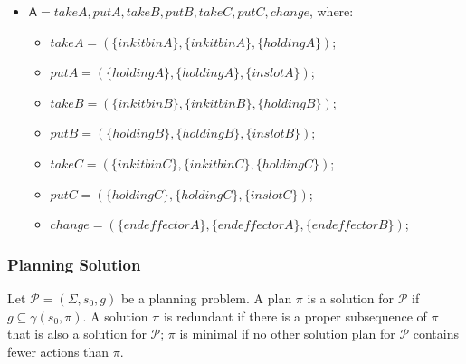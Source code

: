 \begin{itemize}
\item $\mathsf{A}={takeA,putA,takeB,putB,takeC,putC,change}$, where:
\begin{itemize}
\item $takeA=(\lbrace inkitbinA\rbrace,\lbrace inkitbinA\rbrace,\lbrace holdingA\rbrace)$;
\item $putA=(\lbrace holdingA\rbrace,\lbrace holdingA\rbrace,\lbrace inslotA\rbrace)$;
\item $takeB=(\lbrace inkitbinB\rbrace,\lbrace inkitbinB\rbrace,\lbrace holdingB\rbrace)$;
\item $putB=(\lbrace holdingB\rbrace,\lbrace holdingB\rbrace,\lbrace inslotB\rbrace)$;
\item $takeC=(\lbrace inkitbinC\rbrace,\lbrace inkitbinC\rbrace,\lbrace holdingC\rbrace)$;
\item $putC=(\lbrace holdingC\rbrace,\lbrace holdingC\rbrace,\lbrace inslotC\rbrace)$;
\item $change=(\lbrace endeffectorA\rbrace,\lbrace endeffectorA\rbrace,\lbrace endeffectorB\rbrace)$;
\end{itemize}
\end{itemize}

\subsubsection{Planning Solution}
\begin{defn} Let $\mathcal{P}=(\Sigma,s_0,g)$ be a planning problem. A plan $\pi$ is a solution for $\mathcal{P}$ if
$g\subseteq\gamma(s_0,\pi)$. A solution $\pi$ is redundant if there is a proper subsequence of $\pi$ that
is also a solution for $\mathcal{P}$; $\pi$ is minimal if no other solution plan for $\mathcal{P}$ contains fewer
actions than $\pi$.

\end{defn}